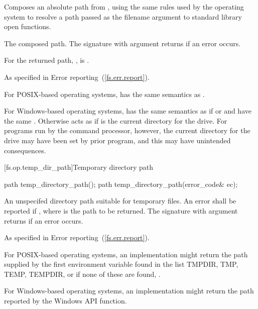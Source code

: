 \begin{itemdescr}
\pnum
\effects Composes an absolute path from , using the
  same rules used by the operating system to resolve a path passed as the
  filename argument to standard library open functions.

\pnum
\returns The composed path. The signature with argument 
  returns  if an error occurs.

\pnum
\postcondition For the returned path, ,  is .

\pnum
\throws As specified in Error reporting~(\ref{fs.err.report}).

\pnum
\begin{example} For POSIX-based operating systems, 
  has the same semantics as .

\pnum
For Windows-based operating systems,  has the
  same semantics as  if
   or
   and  have the same .
  Otherwise  acts as if  is
  the current directory for the  drive.
  For programs run by the command processor, however, the current directory
  for the  drive may have been set by prior program,
  and this may have unintended consequences.
\end{example}

\end{itemdescr}

[fs.op.temp_dir_path]{Temporary directory path}

\begin{itemdecl}
path temp_directory_path();
path temp_directory_path(error_code& ec);
\end{itemdecl}

\begin{itemdescr}
\pnum
\returns An unspecifed directory path suitable for temporary files. An error shall be reported if
, where  is the path to be returned.
  The signature with argument  returns  if an
  error occurs.

\pnum
\throws As specified in Error reporting~(\ref{fs.err.report}).

\pnum
\begin{example} For POSIX-based operating systems, an implementation might
  return the path
  supplied by the first environment variable found in the list TMPDIR, TMP, TEMP, TEMPDIR,
  or if none of these are found, .

\pnum
For Windows-based operating systems, an implementation might return the path
  reported by the Windows  API function.
\end{example}
\end{itemdescr}

